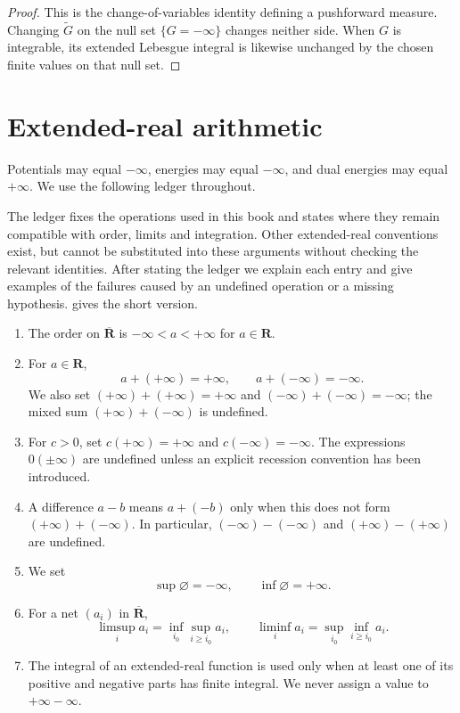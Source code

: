 \begin{proof}
This is the change-of-variables identity defining a pushforward measure.
Changing $\widetilde G$ on the null set $\{G=-\infty\}$ changes neither
side.  When $G$ is integrable, its extended Lebesgue integral is likewise
unchanged by the chosen finite values on that null set.
\end{proof}

\section{Extended-real arithmetic}
\label{sec:extended-arithmetic}

Potentials may equal $-\infty$, energies may equal $-\infty$, and dual
energies may equal $+\infty$.  We use the following ledger throughout.

The ledger fixes the operations used in this book and states where they
remain compatible with order, limits and integration.  Other extended-real
conventions exist, but cannot be substituted into these arguments without
checking the relevant identities.  After stating the ledger we explain each
entry and give examples of the failures caused by an undefined operation
or a missing hypothesis.   gives the short version.

\begin{enumerate}
\item The order on $\overline{\mathbf R}$ is
  $-\infty<a<+\infty$ for $a\in\mathbf R$.
\item For $a\in\mathbf R$,
  \[
  a+(+\infty)=+\infty,\qquad a+(-\infty)=-\infty.
  \]
  We also set $(+\infty)+(+\infty)=+\infty$ and
  $(-\infty)+(-\infty)=-\infty$; the mixed sum
  $(+\infty)+(-\infty)$ is undefined.
\item For $c>0$, set $c(+\infty)=+\infty$ and
  $c(-\infty)=-\infty$.  The expressions $0(\pm\infty)$ are undefined unless
  an explicit recession convention has been introduced.
\item A difference $a-b$ means $a+(-b)$ only when this does not form
  $(+\infty)+(-\infty)$.  In particular, $(-\infty)-(-\infty)$ and
  $(+\infty)-(+\infty)$ are undefined.
\item We set
  \[
             \sup\varnothing=-\infty,\qquad
             \inf\varnothing=+\infty.
  \]
\item For a net $(a_i)$ in $\overline{\mathbf R}$,
  \[
  \limsup_i a_i=\inf_{i_0}\sup_{i\geq i_0}a_i,\qquad
  \liminf_i a_i=\sup_{i_0}\inf_{i\geq i_0}a_i.
  \]
\item The integral of an extended-real function is used only when at least
  one of its positive and negative parts has finite integral.  We never
  assign a value to $+\infty-\infty$.
\end{enumerate}


